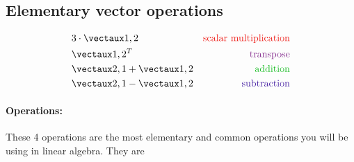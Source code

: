\documentclass{article}
\begin{document}
\color{white}
\subsection{Elementary vector operations}
\color{black}

\begin{align*}
&3 \cdot \vect{1 , 2} & \color{rooj} \textrm{scalar multiplication} \color{black} \\ 
&\vect{1 , 2}^T  & \color{pers} \textrm{transpose} \color{black}\\ 
&\vect{2 , 1} + \vect{1 , 2} &  \color{groen} \textrm{addition}\color{black}\\
&\vect{2 , 1} - \vect{1 , 2} &  \color{blou} \textrm{subtraction}\color{black}
\end{align*}

\paragraph{Operations: } These 4 operations are the most elementary and common operations you will be using in linear algebra. They are 
\end{document}
